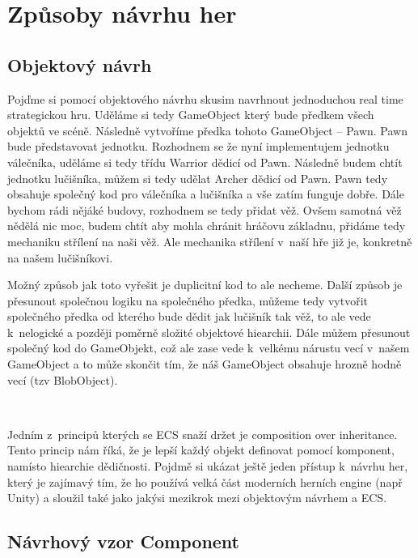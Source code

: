 \chapter{Způsoby návrhu her}
\section{Objektový návrh}
Pojďme si pomocí objektového návrhu skusim navrhnout jednoduchou real time strategickou hru. Uděláme si tedy GameObject který bude předkem všech objektů ve scéně. Následně vytvoříme předka tohoto GameObject -- Pawn. Pawn bude představovat jednotku. Rozhodnem se že nyní implementujem jednotku válečníka, uděláme si tedy třídu Warrior dědicí od Pawn. Následně budem chtít jednotku lučišníka, můžem si tedy udělat Archer dědicí od Pawn. Pawn tedy obsahuje společný kod pro válečníka a lučišníka a vše zatím funguje dobře. Dále bychom rádi nějáké budovy, rozhodnem se tedy přidat věž. Ovšem samotná věž nědělá nic moc, budem chtít aby mohla chránit hráčovu základnu, přidáme tedy mechaniku střílení na naši věž. Ale mechanika střílení v~naší hře již je, konkretně na našem lučišníkovi.

Možný způsob jak toto vyřešit je duplicitní kod to ale necheme. Další způsob je přesunout společnou logiku na společného předka, můžeme tedy vytvořit společného předka od kterého bude dědit jak lučišník tak věž, to ale vede k~nelogické a později poměrně složité objektové hiearchii. Dále můžem přesunout společný kod do GameObjekt, což ale zase vede k~velkému nárustu vecí v~našem GameObject a to může skončit tím, že náš GameObject obsahuje hrozně hodně vecí (tzv BlobObject).

\\

Jedním z~principů kterých se ECS snaží držet je composition over inheritance. Tento princip nám říká, že je lepší každý objekt definovat pomocí komponent, namísto hiearchie dědičnosti. Pojdmě si ukázat ještě jeden přístup k~návrhu her, který je zajímavý tím, že ho používá velká část moderních herních engine (např Unity) a sloužil také jako jakýsi mezikrok mezi objektovým návrhem a ECS.


\section{Návrhový vzor Component}
